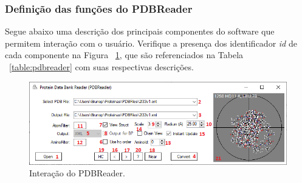 \documentclass[a4paper,12pt]{article}
\begin{document}
	\subsubsection*{Definição das funções do PDBReader}
	Segue abaixo uma descrição dos principais componentes do software que permitem interação com o usuário. Verifique a presença dos identificador \textit{id} de cada componente na Figura ~\ref{fig:pdbreader}, que são referenciados na Tabela ~\ref{table:pdbreader} com suas respectivas descrições.
	
	\begin{figure}[H]
		\begin{center}
			\includegraphics[width=1\linewidth]{pdbreader.png}
		\end{center}
		\caption{Interação do PDBReader.}
		\label{fig:pdbreader}
	\end{figure}
	
\end{document}
